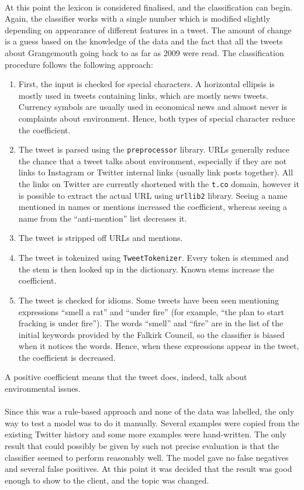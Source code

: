 \paragraph{}
At this point the lexicon is considered finalised, and the classification can begin. Again, the classifier works with a single number which is modified slightly depending on appearance of different features in a tweet. The amount of change is a guess based on the knowledge of the data and the fact that all the tweets about Grangemouth going back to as far as 2009 were read.
The classification procedure follows the following approach:
\begin{enumerate}
    \item First, the input is checked for special characters. A horizontal ellipsis is mostly used in tweets containing links, which are mostly news tweets. Currency symbols are usually used in economical news and almost never is complaints about environment. Hence, both types of special character reduce the coefficient.
    \item The tweet is parsed using the \texttt{preprocessor} library. URLs generally reduce the chance that a tweet talks about environment, especially if they are not links to Instagram or Twitter internal links (usually link posts together). All the links on Twitter are currently shortened with the \texttt{t.co} domain, however it is possible to extract the actual URL using \texttt{urllib2} library. Seeing a name mentioned in names or mentions increased the coefficient, whereas seeing a name from the ``anti-mention'' list decreases it.
    \item The tweet is stripped off URLs and mentions.
    \item The tweet is tokenized using \texttt{TweetTokenizer}. Every token is stemmed and the stem is then looked up in the dictionary. Known stems increase the coefficient.
    \item The tweet is checked for idioms. Some tweets have been seen mentioning expressions ``smell a rat'' and ``under fire'' (for example, ``the plan to start fracking is under fire''). The words ``smell'' and ``fire'' are in the list of the initial keywords provided by the Falkirk Council, so the classifier is biased when it notices the words. Hence, when these expressions appear in the tweet, the coefficient is decreased. 
\end{enumerate}

A positive coefficient means that the tweet does, indeed, talk about environmental issues. 
\paragraph{}
Since this was a rule-based approach and none of the data was labelled, the only way to test a model was to do it manually. Several examples were copied from the existing Twitter history and some more examples were hand-written. The only result that could possibly be given by such not precise evaluation is that the classifier seemed to perform reasonably well. The model gave no false negatives and several false positives. At this point it was decided that the result was good enough to show to the client, and the topic was changed.

